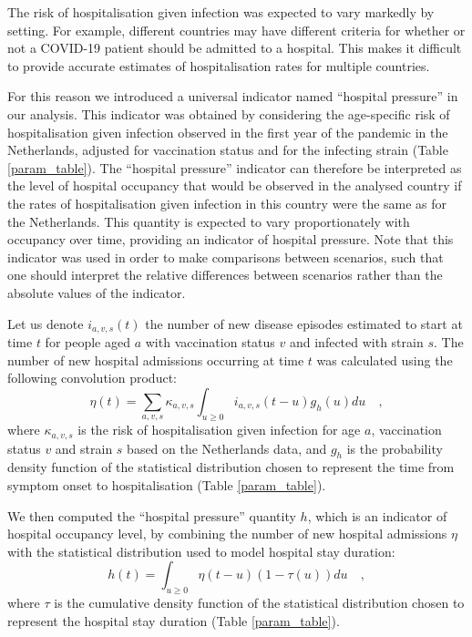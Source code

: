 The risk of hospitalisation given infection was expected to vary markedly by setting.
For example, different countries may have different criteria for whether or not a COVID-19 
patient should be admitted to a hospital. This makes it difficult to provide accurate 
estimates of hospitalisation rates for multiple countries. 

For this reason we introduced a universal indicator named ``hospital pressure'' in our analysis. This indicator
was obtained by considering the age-specific risk of hospitalisation given infection observed in the first year
of the pandemic in the Netherlands, adjusted for vaccination status and for the infecting strain (Table \ref{param_table}).
The ``hospital pressure'' indicator can therefore be interpreted as the level of hospital occupancy that
would be observed in the analysed country if the rates of hospitalisation given infection in this country were the same
as for the Netherlands. This quantity is expected to vary proportionately with occupancy over time, providing an indicator of 
hospital pressure. Note that this indicator was used in order to make comparisons between scenarios, such that one should interpret the relative
differences between scenarios rather than the absolute values of the indicator. 

Let us denote $i_{a,v,s}(t)$ the number of new disease episodes estimated to start at time $t$ for people aged $a$ with vaccination status $v$
and infected with strain $s$. The number of new hospital admissions occurring at time $t$ was calculated using the following
convolution product:
\begin{equation}
 \eta(t) = \sum_{a,v,s} \kappa_{a,v,s} \int_{u \geq 0}  i_{a,v,s}(t-u)g_{h}(u) du   \quad,
 \end{equation}
where $\kappa_{a,v,s}$ is the risk of hospitalisation given infection for age $a$, vaccination status $v$ and strain $s$ 
based on the Netherlands data, and $g_h$ is the probability density function of the statistical distribution chosen to represent the 
time from symptom onset to hospitalisation (Table \ref{param_table}). 

We then computed the ``hospital pressure'' quantity $h$, which is an indicator of hospital occupancy level, by combining the number of new 
hospital admissions $\eta$ with the statistical distribution used to model hospital stay duration:
\begin{equation}
h(t) = \int_{u \geq 0}  \eta(t-u) (1 - \tau(u)) du   \quad,
\end{equation}
where $\tau$ is the cumulative density function of the statistical distribution chosen to represent the 
hospital stay duration (Table \ref{param_table}). 
